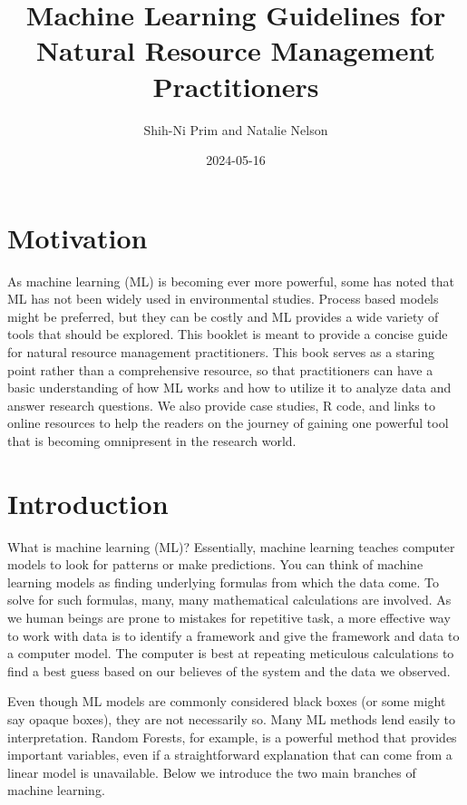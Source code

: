 \documentclass[
]{book}
\title{Machine Learning Guidelines for Natural Resource Management Practitioners}
\author{Shih-Ni Prim and Natalie Nelson}
\date{2024-05-16}
\begin{document}
\maketitle

{
\setcounter{tocdepth}{1}
\tableofcontents
}
\hypertarget{motivation}{%
\chapter{Motivation}\label{motivation}}

As machine learning (ML) is becoming ever more powerful, some has noted that ML has not been widely used in environmental studies. Process based models might be preferred, but they can be costly and ML provides a wide variety of tools that should be explored. This booklet is meant to provide a concise guide for natural resource management practitioners. This book serves as a staring point rather than a comprehensive resource, so that practitioners can have a basic understanding of how ML works and how to utilize it to analyze data and answer research questions. We also provide case studies, R code, and links to online resources to help the readers on the journey of gaining one powerful tool that is becoming omnipresent in the research world.

\hypertarget{intro}{%
\chapter{Introduction}\label{intro}}

What is machine learning (ML)? Essentially, machine learning teaches computer models to look for patterns or make predictions. You can think of machine learning models as finding underlying formulas from which the data come. To solve for such formulas, many, many mathematical calculations are involved. As we human beings are prone to mistakes for repetitive task, a more effective way to work with data is to identify a framework and give the framework and data to a computer model. The computer is best at repeating meticulous calculations to find a best guess based on our believes of the system and the data we observed.

Even though ML models are commonly considered black boxes (or some might say opaque boxes), they are not necessarily so. Many ML methods lend easily to interpretation. Random Forests, for example, is a powerful method that provides important variables, even if a straightforward explanation that can come from a linear model is unavailable. Below we introduce the two main branches of machine learning.
\end{document}
